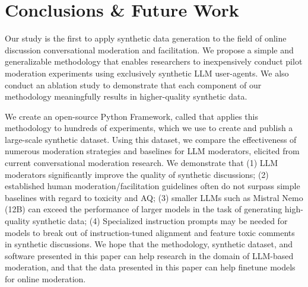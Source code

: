 %
\section{Conclusions \& Future Work}

Our study is the first to apply synthetic data generation to the field of online discussion conversational moderation and facilitation. We propose a simple and generalizable methodology that enables researchers to inexpensively conduct pilot moderation experiments using exclusively synthetic \ac{LLM} user-agents. We also conduct an ablation study to demonstrate that each component of our methodology meaningfully results in higher-quality synthetic data.

We create an open-source Python Framework, called \syndisco that applies this methodology to hundreds of experiments, which we use to create and publish \vmd a large-scale synthetic dataset. Using this dataset, we compare the effectiveness of numerous moderation strategies and baselines for \ac{LLM} moderators, elicited from current conversational moderation research. We demonstrate that (1) \ac{LLM} moderators significantly improve the quality of synthetic discussions; (2) established human moderation/facilitation guidelines often do not surpass simple baselines with regard to toxicity and \ac{AQ}; (3) smaller \acp{LLM} such as Mistral Nemo (12B) can exceed the performance of larger models in the task of generating high-quality synthetic data; (4) Specialized instruction prompts may be needed for models to break out of instruction-tuned alignment and feature toxic comments in synthetic discussions. We hope that the methodology, synthetic dataset, and software presented in this paper can help research in the domain of \ac{LLM}-based moderation, and that the data presented in this paper can help finetune models for online moderation.

